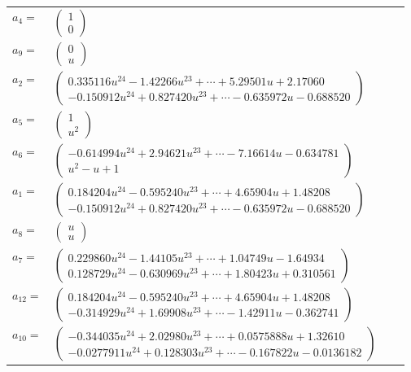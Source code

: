 \documentclass[1p]{elsarticle_modified}
\theoremstyle{definition}
\begin{document}
\begin{tabular}{m{7pt} m{180pt} m{7pt} m{180pt} }
\flushright $a_{4}=$&$\begin{pmatrix}1\\0\end{pmatrix}$ \\
\flushright $a_{9}=$&$\begin{pmatrix}0\\u\end{pmatrix}$ \\
\flushright $a_{2}=$&$\begin{pmatrix}0.335116 u^{24}-1.42266 u^{23}+\cdots+5.29501 u+2.17060\\-0.150912 u^{24}+0.827420 u^{23}+\cdots-0.635972 u-0.688520\end{pmatrix}$ \\
\flushright $a_{5}=$&$\begin{pmatrix}1\\u^2\end{pmatrix}$ \\
\flushright $a_{6}=$&$\begin{pmatrix}-0.614994 u^{24}+2.94621 u^{23}+\cdots-7.16614 u-0.634781\\u^2- u+1\end{pmatrix}$ \\
\flushright $a_{1}=$&$\begin{pmatrix}0.184204 u^{24}-0.595240 u^{23}+\cdots+4.65904 u+1.48208\\-0.150912 u^{24}+0.827420 u^{23}+\cdots-0.635972 u-0.688520\end{pmatrix}$ \\
\flushright $a_{8}=$&$\begin{pmatrix}u\\u\end{pmatrix}$ \\
\flushright $a_{7}=$&$\begin{pmatrix}0.229860 u^{24}-1.44105 u^{23}+\cdots+1.04749 u-1.64934\\0.128729 u^{24}-0.630969 u^{23}+\cdots+1.80423 u+0.310561\end{pmatrix}$ \\
\flushright $a_{12}=$&$\begin{pmatrix}0.184204 u^{24}-0.595240 u^{23}+\cdots+4.65904 u+1.48208\\-0.314929 u^{24}+1.69908 u^{23}+\cdots-1.42911 u-0.362741\end{pmatrix}$ \\
\flushright $a_{10}=$&$\begin{pmatrix}-0.344035 u^{24}+2.02980 u^{23}+\cdots+0.0575888 u+1.32610\\-0.0277911 u^{24}+0.128303 u^{23}+\cdots-0.167822 u-0.0136182\end{pmatrix}$ \\

\end{tabular}
\end{document}
